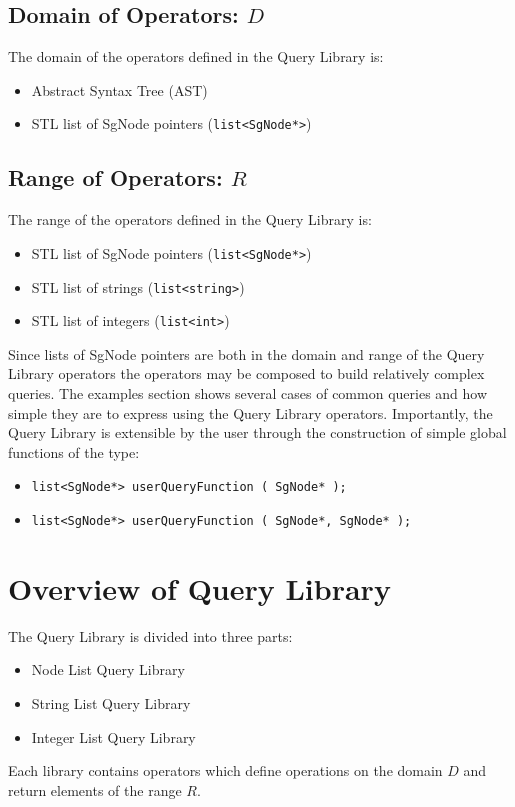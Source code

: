 {\subsection{Domain of Operators: $D$}
    The domain of the operators defined in the Query Library is:
\begin{itemize}
     \item Abstract Syntax Tree (AST)
     \item STL list of SgNode pointers ({\tt list<SgNode*>})
\end{itemize}

\subsection{Range of Operators: $R$}
    The range of the operators defined in the Query Library is:
\begin{itemize}
     \item STL list of SgNode pointers ({\tt list<SgNode*>})
     \item STL list of strings ({\tt list<string>})
     \item STL list of integers ({\tt list<int>})
\end{itemize}

Since lists of SgNode pointers are both in the domain and range of the Query Library
operators the operators may be composed to build relatively complex queries.  The examples
section shows several cases of common queries and how simple they are to express
using the Query Library operators.  Importantly, the Query Library is extensible
by the user through the construction of simple global functions of the type:
\begin{itemize}
     \item {\tt list<SgNode*> userQueryFunction ( SgNode* );}
     \item {\tt list<SgNode*> userQueryFunction ( SgNode*, SgNode* );}
\end{itemize}

\section{Overview of Query Library}
    The Query Library is divided into three parts:
\begin{itemize}
     \item Node List Query Library
     \item String List Query Library
     \item Integer List Query Library
\end{itemize}
Each library contains operators which define operations on the domain $D$ and
return elements of the range $R$.

}

